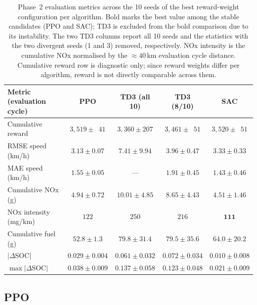 \begin{table}[H]
  \centering
  \small
  \begin{tabular}{lcccc}
    \hline
    \textbf{Metric (evaluation cycle)} & \textbf{PPO} & \textbf{TD3 (all 10)} & \textbf{TD3 (8/10)} & \textbf{SAC} \\
    \hline
    Cumulative reward            & $3{,}519 \pm \phantom{0}41$ & $3{,}360 \pm 207$ & $3{,}461 \pm \phantom{0}51$ & $3{,}520 \pm \phantom{0}51$ \\
    \ac{RMSE} speed (km/h)       & $\mathbf{3.13 \pm 0.07}$ & $7.41 \pm 9.94$ & $3.96 \pm 0.47$ & $3.33 \pm 0.33$ \\
    \ac{MAE} speed (km/h)        & $1.55 \pm 0.05$ & --- & $1.91 \pm 0.45$ & $\mathbf{1.43 \pm 0.46}$ \\
    Cumulative \ac{NOx} (g)      & $4.94 \pm 0.72$ & $10.01 \pm 4.85$ & $8.65 \pm 4.43$ & $\mathbf{4.51 \pm 1.46}$ \\
    \ac{NOx} intensity (mg/km)   & $122$ & $250$ & $216$ & $\mathbf{111}$ \\
    Cumulative fuel (g)          & $\mathbf{52.8 \pm 1.3}$ & $79.8 \pm 31.4$ & $79.5 \pm 35.6$ & $64.0 \pm 20.2$ \\
    $|\Delta$\ac{SOC}$|$         & $0.029 \pm 0.004$ & $0.061 \pm 0.032$ & $0.072 \pm 0.034$ & $\mathbf{0.010 \pm 0.008}$ \\
    $\max|\Delta$\ac{SOC}$|$     & $0.038 \pm 0.009$ & $0.137 \pm 0.058$ & $0.123 \pm 0.048$ & $\mathbf{0.021 \pm 0.009}$ \\
    \hline
  \end{tabular}
  \caption[Phase~2 evaluation summary]{Phase~2 evaluation metrics across the 10 seeds of the best reward-weight configuration per algorithm. Bold marks the best value among the stable candidates (PPO and SAC); \ac{TD3} is excluded from the bold comparison due to its instability. The two \ac{TD3} columns report all 10 seeds and the statistics with the two divergent seeds (1 and 3) removed, respectively. \ac{NOx} intensity is the cumulative \ac{NOx} normalised by the $\approx 40$\,km evaluation cycle distance. Cumulative reward row is diagnostic only; since reward weights differ per algorithm, reward is not directly comparable across them.}
  \label{tab:phase2_summary}
\end{table}


\subsection{PPO}
\label{subsec:results_phase2_ppo}

